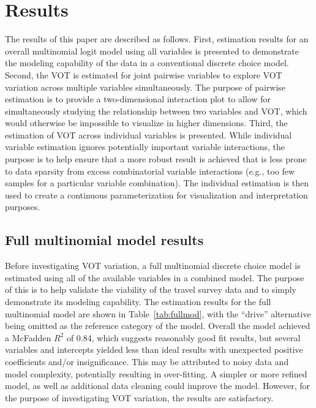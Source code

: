 \documentclass[numbered]{trbunofficial}\usepackage[]{graphicx}\usepackage[]{color}
\begin{document}
\section{Results}\label{sec:results}
The results of this paper are described as follows. First, estimation results for an overall multinomial logit model using all variables is presented to demonstrate the modeling capability of the data in a conventional discrete choice model. Second, the VOT is estimated for joint pairwise variables to explore VOT variation across multiple variables simultaneously. The purpose of pairwise estimation is to provide a two-dimensional interaction plot to allow for simultaneously studying the relationship between two variables and VOT, which would otherwise be impossible to visualize in higher dimensions. Third, the estimation of VOT across individual variables is presented. While individual variable estimation ignores potentially important variable interactions, the purpose is to help ensure that a more robust result is achieved that is less prone to data sparsity from excess combinatorial variable interactions (e.g., too few samples for a particular variable combination). The individual estimation is then used to create a continuous parameterization for visualization and interpretation purposes.

\subsection{Full multinomial model results}
Before investigating VOT variation, a full multinomial discrete choice model is estimated using all of the available variables in a combined model. The purpose of this is to help validate the viability of the travel survey data and to simply demonstrate its modeling capability. The estimation results for the full multinomial model are shown in Table~\ref{tab:fullmod}, with the ``drive'' alternative being omitted as the reference category of the model. Overall the model achieved a McFadden $R^2$ of 0.84, which suggests reasonably good fit results, but several variables and intercepts yielded less than ideal results with unexpected positive coefficients and/or insignificance. This may be attributed to noisy data and model complexity, potentially resulting in over-fitting. A simpler or more refined model, as well as additional data cleaning could improve the model. However, for the purpose of investigating VOT variation, the results are satisfactory.
\end{document}
